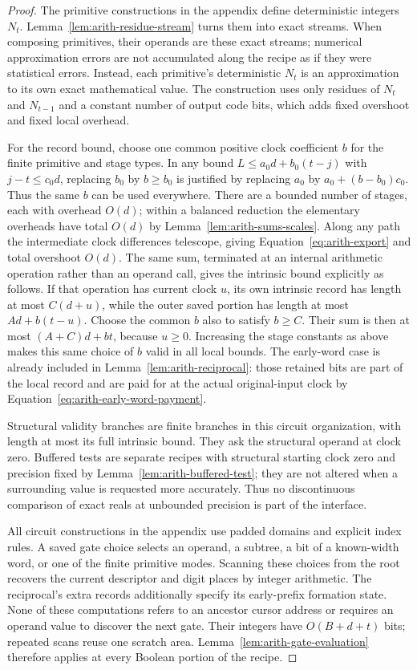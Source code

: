 \begin{proof}
The primitive constructions in the appendix define deterministic integers $N_t$.
Lemma~\ref{lem:arith-residue-stream}
turns them into exact streams.  When composing primitives,
their operands are these exact streams; numerical approximation
errors are not accumulated along the recipe as if they were
statistical errors.  Instead, each primitive's deterministic
$N_t$ is an approximation to its own exact mathematical value.
The construction uses only residues of $N_t$ and $N_{t-1}$ and
a constant number of output code bits, which adds fixed
overshoot and fixed local overhead.

For the record bound, choose one common positive clock
coefficient $b$ for the finite primitive and stage types.  In any
bound $L\leq a_0d+b_0(t-j)$ with $j-t\leq c_0d$, replacing
$b_0$ by $b\geq b_0$ is justified by replacing $a_0$ by
$a_0+(b-b_0)c_0$.  Thus the same $b$ can be used everywhere.
There are a bounded number of stages, each with overhead $O(d)$;
within a balanced reduction the elementary overheads have total
$O(d)$ by Lemma~\ref{lem:arith-sums-scales}.  Along any path
the intermediate clock differences telescope, giving
Equation~\eqref{eq:arith-export} and total overshoot $O(d)$.
The same sum, terminated at an internal arithmetic operation
rather than an operand call, gives the intrinsic bound explicitly
as follows.  If that operation has current clock $u$, its own
intrinsic record has length at most $C(d+u)$, while the outer
saved portion has length at most $A d+b(t-u)$.  Choose the
common $b$ also to satisfy $b\geq C$.  Their sum is then at most
$(A+C)d+bt$, because $u\geq0$.  Increasing the stage constants
as above makes this same choice of $b$ valid in all local bounds.
The early-word case is already included in
Lemma~\ref{lem:arith-reciprocal}: those retained bits are part of
the local record and are paid for at the actual original-input
clock by Equation~\eqref{eq:arith-early-word-payment}.

Structural validity branches are finite branches in this circuit
organization, with length at most its full intrinsic bound.
They ask the structural operand at clock zero.  Buffered tests
are separate recipes with structural starting clock zero and
precision fixed by Lemma~\ref{lem:arith-buffered-test}; they are
not altered when a surrounding value is requested more accurately.
Thus no discontinuous comparison of exact reals at unbounded
precision is part of the interface.

All circuit constructions in the appendix use padded domains and explicit index rules.  A saved gate choice selects an operand, a subtree,
a bit of a known-width word, or one of the finite primitive modes.
Scanning these choices from the root recovers the current
descriptor and digit places by integer arithmetic.  The
reciprocal's extra records additionally specify its early-prefix
formation state.  None of these computations refers to an
ancestor cursor address or requires an operand value to discover
the next gate.  Their integers have $O(B+d+t)$ bits; repeated
scans reuse one scratch area.  Lemma~\ref{lem:arith-gate-evaluation}
therefore applies at every Boolean portion of the recipe.


\end{proof}
